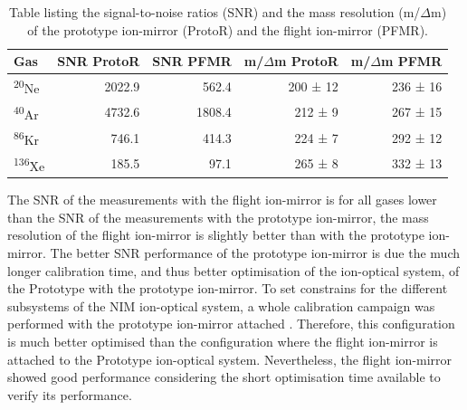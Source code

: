 	\begin{table}[H]
		\begin{center}
		\begin{tabular}{|l|r|r|r|r|}
			\hline
			Gas						&SNR ProtoR	&SNR PFMR	&m/$\Delta$m ProtoR	&m/$\Delta$m PFMR\\
			\hline
			\textsuperscript{20}Ne	&2022.9		&562.4		&200 ± 12		&236 ± 16\\
			\textsuperscript{40}Ar	&4732.6		&1808.4		&212 ±  9		&267 ± 15\\
			\textsuperscript{86}Kr	&746.1		&414.3		&224 ±  7		&292 ± 12\\
			\textsuperscript{136}Xe	&185.5		&97.1		&265 ±  8		&332 ± 13\\
			\hline
		\end{tabular}
		\end{center}
		\caption{Table listing the signal-to-noise ratios (SNR) and the mass resolution (m/$\Delta$m) of the prototype ion-mirror (ProtoR) and the flight ion-mirror (PFMR).}
		\label{tab:refPerftab}
	\end{table}
	The SNR of the measurements with the flight ion-mirror is for all gases lower than the SNR of the measurements with the prototype ion-mirror, the mass resolution of the flight ion-mirror is slightly better than with the prototype ion-mirror. The better SNR performance of the prototype ion-mirror is due the much longer calibration time, and thus better optimisation of the ion-optical system, of the Prototype with the prototype ion-mirror. To set constrains for the different subsystems of the NIM ion-optical system, a whole calibration campaign was performed with the prototype ion-mirror attached \cite{Diss_Meyer}. Therefore, this configuration is much better optimised than the configuration where the flight ion-mirror is attached to the Prototype ion-optical system. Nevertheless, the flight ion-mirror showed good performance considering the short optimisation time available to verify its performance.
	
	
